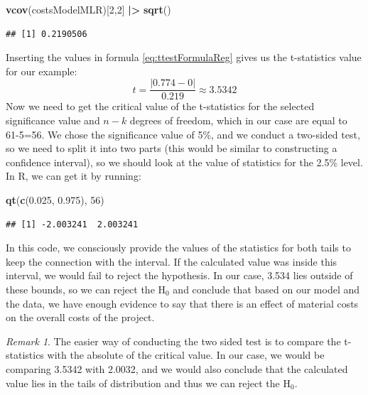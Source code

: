 \documentclass[
]{book}
\newenvironment{Shaded}{\begin{snugshade}}{\end{snugshade}}
\newcommand{\DecValTok}[1]{\textcolor[rgb]{0.00,0.00,0.81}{#1}}
\newcommand{\FloatTok}[1]{\textcolor[rgb]{0.00,0.00,0.81}{#1}}
\newcommand{\FunctionTok}[1]{\textcolor[rgb]{0.13,0.29,0.53}{\textbf{#1}}}
\newcommand{\NormalTok}[1]{#1}
\newcommand{\SpecialCharTok}[1]{\textcolor[rgb]{0.81,0.36,0.00}{\textbf{#1}}}
\theoremstyle{definition}
\theoremstyle{definition}
\theoremstyle{definition}
\theoremstyle{definition}
\theoremstyle{remark}
\newtheorem*{remark}{Remark}
\begin{document}
\begin{Shaded}
\begin{Highlighting}[]
\FunctionTok{vcov}\NormalTok{(costsModelMLR)[}\DecValTok{2}\NormalTok{,}\DecValTok{2}\NormalTok{] }\SpecialCharTok{|\textgreater{}} \FunctionTok{sqrt}\NormalTok{()}
\end{Highlighting}
\end{Shaded}

\begin{verbatim}
## [1] 0.2190506
\end{verbatim}

Inserting the values in formula \eqref{eq:ttestFormulaReg} gives us the t-statistics value for our example:
\begin{equation*}
t = \frac{|0.774 - 0|}{0.219} \approx 3.5342 
\end{equation*}
Now we need to get the critical value of the t-statistics for the selected significance value and \(n-k\) degrees of freedom, which in our case are equal to 61-5=56. We chose the significance value of 5\%, and we conduct a two-sided test, so we need to split it into two parts (this would be similar to constructing a confidence interval), so we should look at the value of statistics for the 2.5\% level. In R, we can get it by running:

\begin{Shaded}
\begin{Highlighting}[]
\FunctionTok{qt}\NormalTok{(}\FunctionTok{c}\NormalTok{(}\FloatTok{0.025}\NormalTok{, }\FloatTok{0.975}\NormalTok{), }\DecValTok{56}\NormalTok{)}
\end{Highlighting}
\end{Shaded}

\begin{verbatim}
## [1] -2.003241  2.003241
\end{verbatim}

In this code, we consciously provide the values of the statistics for both tails to keep the connection with the interval. If the calculated value was inside this interval, we would fail to reject the hypothesis. In our case, 3.534 lies outside of these bounds, so we can reject the H\(_0\) and conclude that based on our model and the data, we have enough evidence to say that there is an effect of material costs on the overall costs of the project.

\begin{remark}
The easier way of conducting the two sided test is to compare the t-statistics with the absolute of the critical value. In our case, we would be comparing 3.5342 with 2.0032, and we would also conclude that the calculated value lies in the tails of distribution and thus we can reject the H\(_0\).
\end{remark}
\end{document}
